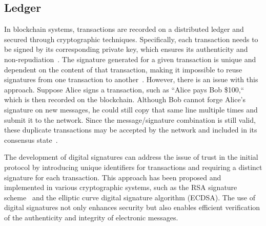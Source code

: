 \subsection{Ledger}
In blockchain systems, transactions are recorded on a distributed ledger and secured through cryptographic techniques.
Specifically, each transaction needs to be signed by its corresponding private key, which ensures its authenticity and
non-repudiation~\cite{stinson2018cryptography}. The signature generated for a given transaction is unique and dependent
on the content of that transaction, making it impossible to reuse signatures from one transaction to another~\cite{bruce1996applied}.
However, there is an issue with this approach. Suppose Alice signs a transaction, such as ``Alice pays Bob \$100,`` which
is then recorded on the blockchain. Although Bob cannot forge Alice's signature on new messages, he could still copy that
same line multiple times and submit it to the network. Since the message/signature combination is still valid, these duplicate
transactions may be accepted by the network and included in its consensus state~\cite{swan2015blockchain}.

%

The development of digital signatures can address the issue of trust in the initial protocol by introducing unique identifiers
for transactions and requiring a distinct signature for each transaction. This approach has been proposed and implemented
in various cryptographic systems, such as the RSA signature scheme~\cite{rivest1978method} and the elliptic curve digital
signature algorithm (ECDSA). The use of digital signatures not only enhances security but also enables efficient verification
of the authenticity and integrity of electronic messages.


